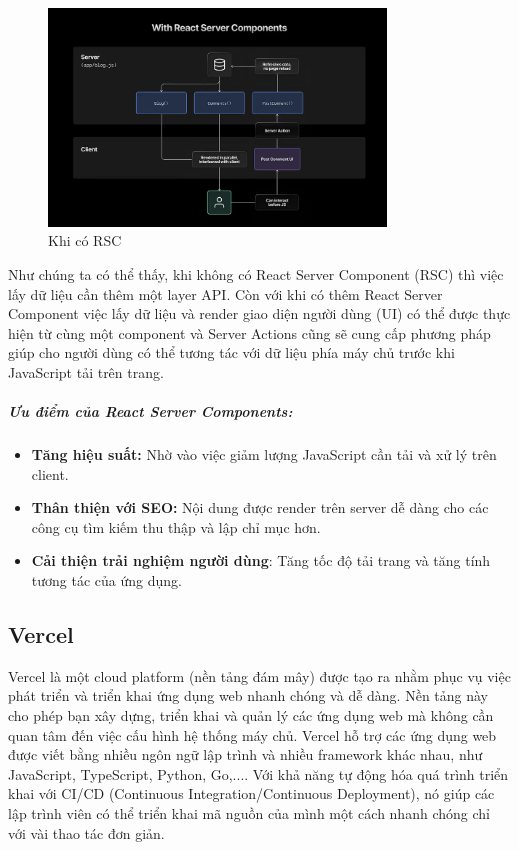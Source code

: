 \begin{figure}[H]
    \centering
    \includegraphics[width=0.8\textwidth]{img/withRSCs.png}
    \vspace{0.5cm}
    \caption{Khi có RSC}
\end{figure}

Như chúng ta có thể thấy, khi không có React Server Component (RSC) thì việc lấy dữ liệu cần thêm một layer API. Còn với khi có thêm React Server Component việc lấy dữ liệu và render giao diện người dùng (UI) có thể được thực hiện từ cùng một component và Server Actions cũng sẽ cung cấp phương pháp giúp cho người dùng có thể tương tác với dữ liệu phía máy chủ trước khi JavaScript tải trên trang. 

\subparagraph{Ưu điểm của React Server Components:}
\begin{itemize}
    \item \textbf{Tăng hiệu suất:} Nhờ vào việc giảm lượng JavaScript cần tải và xử lý trên client.
    \item \textbf{Thân thiện với SEO:} Nội dung được render trên server dễ dàng cho các công cụ tìm kiếm thu thập và lập chỉ mục hơn. 
    \item \textbf{Cải thiện trải nghiệm người dùng}: Tăng tốc độ tải trang và tăng tính tương tác của ứng dụng. 
\end{itemize}

\subsection{Vercel}

Vercel là một cloud platform (nền tảng đám mây) được tạo ra nhằm phục vụ việc phát triển và triển khai ứng dụng web nhanh chóng và dễ dàng. Nền tảng này cho phép bạn xây dựng, triển khai và quản lý các ứng dụng web mà không cần quan tâm đến việc cấu hình hệ thống máy chủ. Vercel hỗ trợ các ứng dụng web được viết bằng nhiều ngôn ngữ lập trình và nhiều framework khác nhau, như JavaScript, TypeScript, Python, Go,.... Với khả năng tự động hóa quá trình triển khai với CI/CD (Continuous Integration/Continuous Deployment), nó giúp các lập trình viên có thể triển khai mã nguồn của mình một cách nhanh chóng chỉ với vài thao tác đơn giản. 

